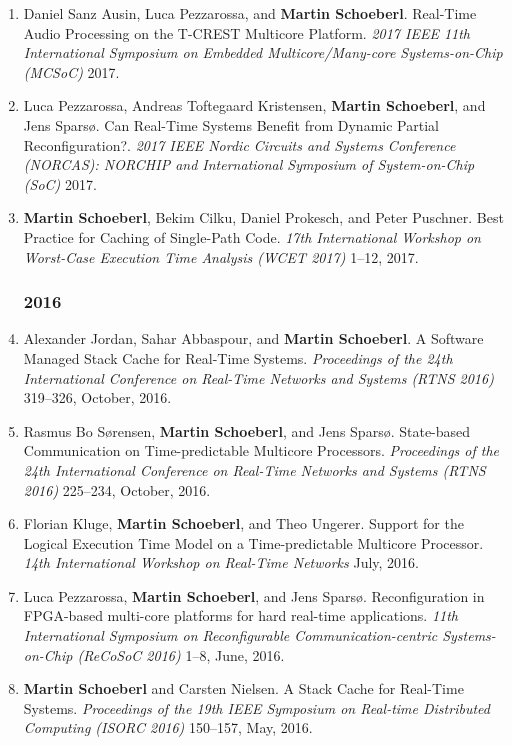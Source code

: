 \begin{enumerate}
\item Daniel Sanz Ausin, Luca Pezzarossa, and {\bf Martin Schoeberl}.
 Real-Time Audio Processing on the T-CREST Multicore Platform.
 \emph{2017 IEEE 11th International Symposium on Embedded Multicore/Many-core Systems-on-Chip (MCSoC)} 2017.

\item Luca Pezzarossa, Andreas Toftegaard Kristensen, {\bf Martin Schoeberl}, and Jens Spars{\o}.
 Can Real-Time Systems Benefit from Dynamic Partial Reconfiguration?.
 \emph{2017 IEEE Nordic Circuits and Systems Conference (NORCAS): NORCHIP and International Symposium of System-on-Chip (SoC)} 2017.

\item {\bf Martin Schoeberl}, Bekim Cilku, Daniel Prokesch, and Peter Puschner.
 Best Practice for Caching of Single-Path Code.
 \emph{17th International Workshop on Worst-Case Execution Time Analysis (WCET 2017)} 1--12, 2017.


\subsubsection*{2016}

\item Alexander Jordan, Sahar Abbaspour, and {\bf Martin Schoeberl}.
 A Software Managed Stack Cache for Real-Time Systems.
 \emph{Proceedings of the 24th International Conference on Real-Time Networks and Systems (RTNS 2016)} 319--326, October, 2016.

\item Rasmus Bo S{\o}rensen, {\bf Martin Schoeberl}, and Jens Spars{\o}.
 State-based Communication on Time-predictable Multicore Processors.
 \emph{Proceedings of the 24th International Conference on Real-Time Networks and Systems (RTNS 2016)} 225--234, October, 2016.

\item Florian Kluge, {\bf Martin Schoeberl}, and Theo Ungerer.
 Support for the Logical Execution Time Model on a Time-predictable Multicore Processor.
 \emph{14th International Workshop on Real-Time Networks} July, 2016.

\item Luca Pezzarossa, {\bf Martin Schoeberl}, and Jens Spars{\o}.
 Reconfiguration in FPGA-based multi-core platforms for hard real-time applications.
 \emph{11th International Symposium on Reconfigurable Communication-centric Systems-on-Chip (ReCoSoC 2016)} 1--8, June, 2016.

\item {\bf Martin Schoeberl} and Carsten Nielsen.
 A Stack Cache for Real-Time Systems.
 \emph{Proceedings of the 19th IEEE Symposium on Real-time Distributed Computing (ISORC 2016)} 150--157, May, 2016.


\end{enumerate}

